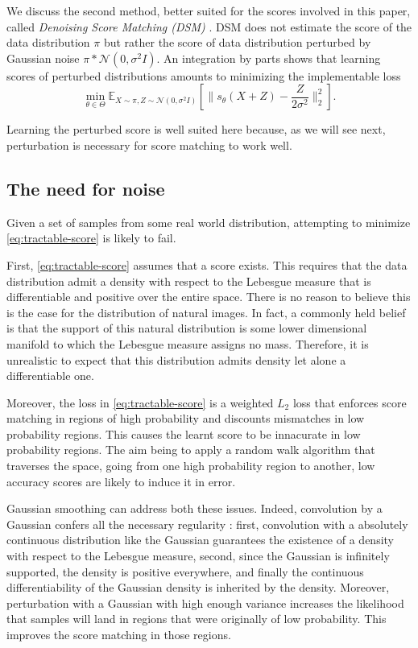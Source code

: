 \documentclass[10pt,journal,a4paper]{IEEEtran}
\theoremstyle{definition}
\newcommand{\E}{\mathbb{E}}
\begin{document}
We discuss the second method, better suited for the scores involved in this paper, called \textit{Denoising Score Matching (DSM)} \cite{vincent_connection_2011}. DSM does not estimate the score of the data distribution $\pi$ but rather the score of data distribution perturbed by Gaussian noise $\pi * \mathcal{N}(0, \sigma^2I)$. An integration by parts shows that learning scores of perturbed distributions amounts to minimizing the implementable loss
\[
\min_{\theta \in \Theta} \E_{X \sim \pi, Z \sim \mathcal{N}(0, \sigma^2I)} \left[ \|s_\theta(X + Z) -  \frac{Z}{2\sigma^2}\|_2^2\right].
\]

Learning the perturbed score is well suited here because, as we will see next, perturbation is necessary for score matching to work well.

\subsection{The need for noise}
\label{sec:noise}

Given a set of samples from some real world distribution, attempting to minimize \eqref{eq:tractable-score} is likely to fail.

First, \eqref{eq:tractable-score} assumes that a score exists. This requires that the data distribution admit a density with respect to the Lebesgue measure that is differentiable and positive over the entire space. There is no reason to believe this is the case for the distribution of natural images. In fact, a commonly held belief is that the support of this natural distribution is some lower dimensional manifold to which the Lebesgue measure assigns no mass. Therefore, it is unrealistic to expect that this distribution admits density let alone a differentiable one.

Moreover, the loss in \eqref{eq:tractable-score} is a weighted $L_2$ loss that enforces score matching in regions of high probability and discounts mismatches in low probability regions. This causes the learnt score to be innacurate in low probability regions. The aim being to apply a random walk algorithm that traverses the space, going from one high probability region to another, low accuracy scores are likely to induce it in error. 

Gaussian smoothing can address both these issues. Indeed, convolution by a Gaussian confers all the necessary regularity : first, convolution with a absolutely continuous distribution like the Gaussian guarantees the existence of a density with respect to the Lebesgue measure, second, since the Gaussian is infinitely supported, the density is positive everywhere, and finally the continuous differentiability of the Gaussian density is inherited by the density. Moreover, perturbation with a Gaussian with high enough variance increases the likelihood that samples will land in regions that were originally of low probability. This improves the score matching in those regions.
\end{document}
